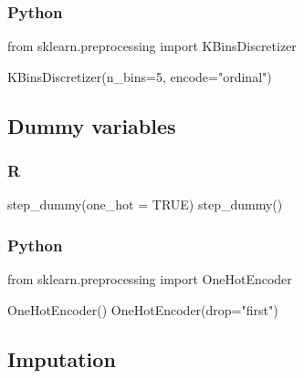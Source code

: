 \documentclass[
  letterpaper,
  DIV=11,
  numbers=noendperiod]{scrreprt}
\newenvironment{Shaded}{\begin{snugshade}}{\end{snugshade}}
\newcommand{\AttributeTok}[1]{\textcolor[rgb]{0.40,0.46,0.14}{#1}}
\newcommand{\ConstantTok}[1]{\textcolor[rgb]{0.56,0.35,0.01}{#1}}
\newcommand{\DecValTok}[1]{\textcolor[rgb]{0.68,0.00,0.00}{#1}}
\newcommand{\FunctionTok}[1]{\textcolor[rgb]{0.28,0.35,0.67}{#1}}
\newcommand{\ImportTok}[1]{\textcolor[rgb]{0.00,0.46,0.62}{#1}}
\newcommand{\NormalTok}[1]{\textcolor[rgb]{0.00,0.46,0.62}{#1}}
\newcommand{\OperatorTok}[1]{\textcolor[rgb]{0.37,0.37,0.37}{#1}}
\newcommand{\StringTok}[1]{\textcolor[rgb]{0.13,0.47,0.30}{#1}}
\begin{document}
\hypertarget{python-65}{%
\subsubsection{Python}\label{python-65}}

\begin{Shaded}
\begin{Highlighting}[]
\ImportTok{from}\NormalTok{ sklearn.preprocessing }\ImportTok{import}\NormalTok{ KBinsDiscretizer}

\NormalTok{KBinsDiscretizer(n\_bins}\OperatorTok{=}\DecValTok{5}\NormalTok{, encode}\OperatorTok{=}\StringTok{"ordinal"}\NormalTok{)}
\end{Highlighting}
\end{Shaded}

\hypertarget{dummy-variables}{%
\subsection{Dummy variables}\label{dummy-variables}}

\hypertarget{r-66}{%
\subsubsection{R}\label{r-66}}

\begin{Shaded}
\begin{Highlighting}[]
\FunctionTok{step\_dummy}\NormalTok{(}\AttributeTok{one\_hot =} \ConstantTok{TRUE}\NormalTok{)}
\FunctionTok{step\_dummy}\NormalTok{()}
\end{Highlighting}
\end{Shaded}

\hypertarget{python-66}{%
\subsubsection{Python}\label{python-66}}

\begin{Shaded}
\begin{Highlighting}[]
\ImportTok{from}\NormalTok{ sklearn.preprocessing }\ImportTok{import}\NormalTok{ OneHotEncoder}

\NormalTok{OneHotEncoder()}
\NormalTok{OneHotEncoder(drop}\OperatorTok{=}\StringTok{"first"}\NormalTok{)}
\end{Highlighting}
\end{Shaded}

\hypertarget{imputation}{%
\subsection{Imputation}\label{imputation}}
\end{document}

